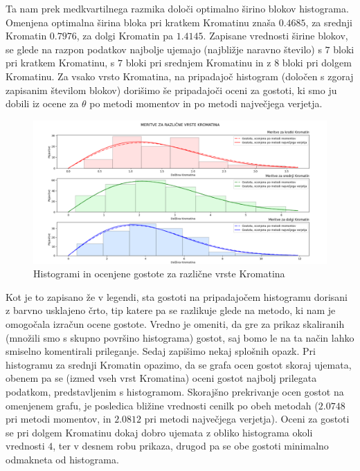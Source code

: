 \documentclass{article}
\begin{document}
Ta nam prek medkvartilnega razmika določi optimalno širino blokov histograma. Omenjena optimalna širina bloka pri kratkem Kromatinu znaša $0.4685$, za srednji Kromatin $0.7976$, za dolgi Kromatin pa $1.4145$.
Zapisane vrednosti širine blokov, se glede na razpon podatkov najbolje ujemajo (najbližje naravno število) s $7$ bloki pri kratkem Kromatinu, s $7$ bloki pri srednjem Kromatinu in z $8$ bloki pri dolgem Kromatinu. 
Za vsako vrsto Kromatina, na pripadajoč histogram (določen s zgoraj zapisanim številom blokov) dorišimo še pripadajoči oceni za gostoti, ki smo ju dobili iz ocene za $\theta$ po metodi momentov in po metodi največjega verjetja. 
\begin{figure}[H]
    \begin{center}
    \includegraphics[width=\linewidth]{naloga2f.png}
    \vspace*{-5mm}\caption{Histogrami in ocenjene gostote za različne vrste Kromatina}
    \end{center}    
\end{figure}
Kot je to zapisano že v legendi, sta gostoti na pripadajočem histogramu dorisani z barvno usklajeno črto, tip katere pa se razlikuje glede na metodo, ki nam je omogočala izračun ocene gostote.
Vredno je omeniti, da gre za prikaz skaliranih (množili smo s skupno površino histograma) gostot, saj bomo le na ta način lahko smiselno komentirali prileganje. 
\newline
Sedaj zapišimo nekaj splošnih opazk.
Pri histogramu za srednji Kromatin opazimo, da se grafa ocen gostot skoraj ujemata, obenem pa se (izmed vseh vrst Kromatina) oceni gostot najbolj prilegata podatkom, predstavljenim s histogramom. 
Skorajšno prekrivanje ocen gostot na omenjenem grafu, je posledica bližine vrednosti cenilk po obeh metodah ($2.0748$ pri metodi momentov,  in $2.0812$ pri metodi največjega verjetja).
Oceni za gostoti se pri dolgem Kromatinu dokaj dobro ujemata z obliko histograma okoli vrednosti $4$, ter v desnem robu prikaza, drugod pa se obe gostoti minimalno odmakneta od histograma. 
\end{document}
